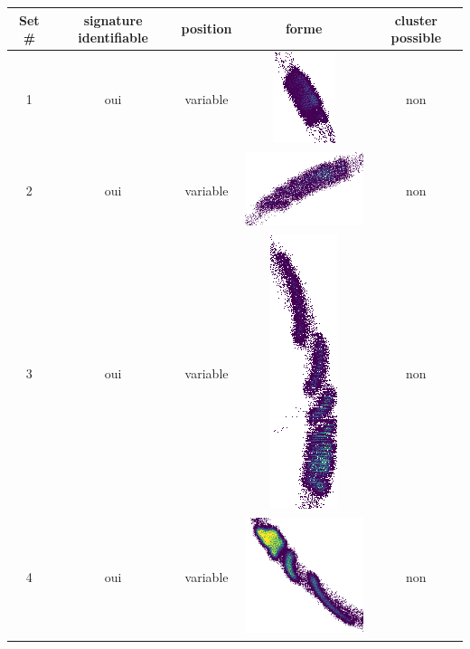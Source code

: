 \begin{table}[h]
\centering
\begin{tabular}{|c|c|c|c|c|}
\hline
Set \# & signature identifiable & position & forme & cluster possible\\
\hline
1 & oui & variable & \includegraphics[scale=0.2]{images/set12.png}  & non \\
\hline
2 & oui & variable & \includegraphics[scale=0.2]{images/set13.png}  & non \\
\hline
3 & oui & variable & \includegraphics[scale=0.2]{images/set14.png}  & non \\
\hline
4 & oui & variable & \includegraphics[scale=0.2]{images/set15.png}  & non \\

\end{tabular}
\end{table}
